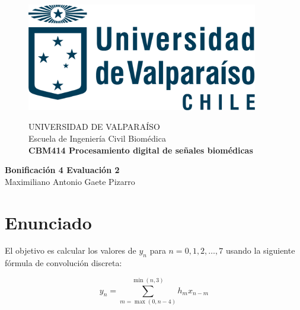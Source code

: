 \documentclass[10pt]{article}
\theoremstyle{definition}
\theoremstyle{remark}
\theoremstyle{definition}
\numberwithin{equation}{prob}
\begin{document}
	
	\begin{titlepage}
		
		
		\begin{figure}
			\begin{minipage}{4cm}
				\includegraphics[width=0.9\textwidth]{./figures/logo}
			\end{minipage}
			\begin{minipage}{11cm}
				\vspace{4mm}
				{\sc UNIVERSIDAD DE VALPARAÍSO}\\
				Escuela de Ingeniería Civil Biomédica\\
				{\bf CBM414 Procesamiento digital de señales biomédicas}\\
				\vspace{0mm}
				\hrulefill
			\end{minipage}
		\end{figure}
		\phantom{""}\vspace{60mm}
		
		
		\begin{center}
			\Huge{\textbf{Bonificación 4 Evaluación 2}}\vspace{95mm}\\
			\raggedleft \Large{Maximiliano Antonio Gaete Pizarro}\\ 
		\end{center}
		
		
	\end{titlepage}
	
\printindex

\section*{Enunciado}

El objetivo es calcular los valores de $y_n$ para $n = 0, 1, 2, \dots, 7$ usando la siguiente fórmula de convolución discreta:

\[
y_n = \sum_{m=\max(0, n-4)}^{\min(n, 3)} h_m x_{n-m}
\]
\end{document}

